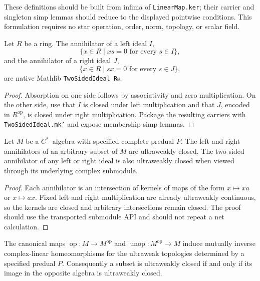 These definitions should be built from infima of \texttt{LinearMap.ker}; their carrier and
singleton simp lemmas should reduce to the displayed pointwise conditions.  This formulation
requires no star operation, order, norm, topology, or scalar field.

\begin{definition}
  \label{def:two_sided_annihilators}
  \notready
  Let $R$ be a ring.  The annihilator of a left ideal $I$,
  \[
    \{x\in R\mid xs=0\text{ for every }s\in I\},
  \]
  and the annihilator of a right ideal $J$,
  \[
    \{x\in R\mid sx=0\text{ for every }s\in J\},
  \]
  are native Mathlib \texttt{TwoSidedIdeal R}s.
\end{definition}

\begin{proof}
  \notready
  Absorption on one side follows by associativity and zero multiplication.  On the other side,
  use that $I$ is closed under left multiplication and that $J$, encoded in $R^{\mathrm{op}}$, is
  closed under right multiplication.  Package the resulting carriers with
  \texttt{TwoSidedIdeal.mk'} and expose membership simp lemmas.
\end{proof}

\begin{lemma}
  \label{lem:annihilators_ultraweak_closed}
  \notready
  Let $M$ be a $C^{*}$--algebra with specified complete predual $P$.  The left and right
  annihilators of an arbitrary subset of $M$ are ultraweakly closed.  The two-sided annihilator of
  any left or right ideal is also ultraweakly closed when viewed through its underlying complex
  submodule.
\end{lemma}

\begin{proof}
  \notready
  Each annihilator is an intersection of kernels of maps of the form $x\mapsto xa$ or
  $x\mapsto ax$.  Fixed left and right multiplication are already ultraweakly continuous, so the
  kernels are closed and arbitrary intersections remain closed.  The proof should use the
  transported submodule API and should not repeat a net calculation.
\end{proof}

\begin{lemma}
  \label{lem:ultraweak_op_homeomorph}
  \notready
  The canonical maps $\operatorname{op}:M\to M^{\mathrm{op}}$ and
  $\operatorname{unop}:M^{\mathrm{op}}\to M$ induce mutually inverse complex-linear
  homeomorphisms for the ultraweak topologies determined by a specified predual $P$.  Consequently
  a subset is ultraweakly closed if and only if its image in the opposite algebra is ultraweakly
  closed.
\end{lemma}

